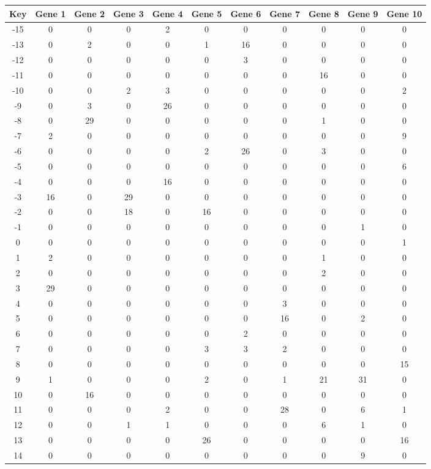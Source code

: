 \begin{tabular}{|c|c|c|c|c|c|c|c|c|c|c|}
\hline
Key & Gene 1 & Gene 2 & Gene 3 & Gene 4 & Gene 5 & Gene 6 & Gene 7 & Gene 8 & Gene 9 & Gene 10 \\
\hline
-15 & 0 & 0 & 0 & 2 & 0 & 0 & 0 & 0 & 0 & 0 \\
-13 & 0 & 2 & 0 & 0 & 1 & 16 & 0 & 0 & 0 & 0 \\
-12 & 0 & 0 & 0 & 0 & 0 & 3 & 0 & 0 & 0 & 0 \\
-11 & 0 & 0 & 0 & 0 & 0 & 0 & 0 & 16 & 0 & 0 \\
-10 & 0 & 0 & 2 & 3 & 0 & 0 & 0 & 0 & 0 & 2 \\
-9 & 0 & 3 & 0 & 26 & 0 & 0 & 0 & 0 & 0 & 0 \\
-8 & 0 & 29 & 0 & 0 & 0 & 0 & 0 & 1 & 0 & 0 \\
-7 & 2 & 0 & 0 & 0 & 0 & 0 & 0 & 0 & 0 & 9 \\
-6 & 0 & 0 & 0 & 0 & 2 & 26 & 0 & 3 & 0 & 0 \\
-5 & 0 & 0 & 0 & 0 & 0 & 0 & 0 & 0 & 0 & 6 \\
-4 & 0 & 0 & 0 & 16 & 0 & 0 & 0 & 0 & 0 & 0 \\
-3 & 16 & 0 & 29 & 0 & 0 & 0 & 0 & 0 & 0 & 0 \\
-2 & 0 & 0 & 18 & 0 & 16 & 0 & 0 & 0 & 0 & 0 \\
-1 & 0 & 0 & 0 & 0 & 0 & 0 & 0 & 0 & 1 & 0 \\
0 & 0 & 0 & 0 & 0 & 0 & 0 & 0 & 0 & 0 & 1 \\
1 & 2 & 0 & 0 & 0 & 0 & 0 & 0 & 1 & 0 & 0 \\
2 & 0 & 0 & 0 & 0 & 0 & 0 & 0 & 2 & 0 & 0 \\
3 & 29 & 0 & 0 & 0 & 0 & 0 & 0 & 0 & 0 & 0 \\
4 & 0 & 0 & 0 & 0 & 0 & 0 & 3 & 0 & 0 & 0 \\
5 & 0 & 0 & 0 & 0 & 0 & 0 & 16 & 0 & 2 & 0 \\
6 & 0 & 0 & 0 & 0 & 0 & 2 & 0 & 0 & 0 & 0 \\
7 & 0 & 0 & 0 & 0 & 3 & 3 & 2 & 0 & 0 & 0 \\
8 & 0 & 0 & 0 & 0 & 0 & 0 & 0 & 0 & 0 & 15 \\
9 & 1 & 0 & 0 & 0 & 2 & 0 & 1 & 21 & 31 & 0 \\
10 & 0 & 16 & 0 & 0 & 0 & 0 & 0 & 0 & 0 & 0 \\
11 & 0 & 0 & 0 & 2 & 0 & 0 & 28 & 0 & 6 & 1 \\
12 & 0 & 0 & 1 & 1 & 0 & 0 & 0 & 6 & 1 & 0 \\
13 & 0 & 0 & 0 & 0 & 26 & 0 & 0 & 0 & 0 & 16 \\
14 & 0 & 0 & 0 & 0 & 0 & 0 & 0 & 0 & 9 & 0 \\
\hline
\end{tabular}